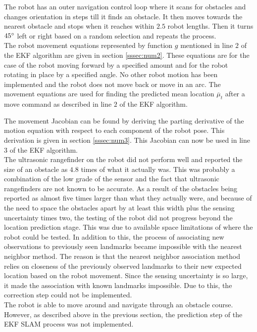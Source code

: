 \documentclass[conference]{IEEEtran}
\begin{document}
The robot has an outer navigation control loop where it scans for obstacles and changes orientation in steps till it finds an obstacle. It then moves towards the nearest obstacle and stops when it reaches within $2.5$ robot lengths. Then it turns $45\degree$ left or right based on a random selection and repeats the process.\\

The robot movement equations represented by function $g$ mentioned in line $2$ of the EKF algorithm are given in section \ref{sssec:num2}. These equations are for the case of the robot moving forward by a specified amount and for the robot rotating in place by a specified angle. No other robot motion has been implemented and the robot does not move back or move in an arc. The movement equations are used for finding the predicted mean location $\overline \mu_t$ after a move command as described in line $2$ of the EKF algorithm.

The movement Jacobian can be found by deriving the parting derivative of the motion equation with respect to each component of the robot pose. This derivation is given in section \ref{sssec:num3}. This Jacobian can now be used in line $3$ of the EKF algorithm.\\

The ultrasonic rangefinder on the robot did not perform well and reported the size of an obstacle as $4.8$ times of what it actually was. This was probably a combination of the low grade of the sensor and the fact that ultrasonic rangefinders are not known to be accurate. As a result of the obstacles being reported as almost five times larger than what they actually were, and because of the need to space the obstacles apart by at least this width plus the sensing uncertainty times two, the testing of the robot did not progress beyond the location prediction stage. This was due to available space limitations of where the robot could be tested. In addition to this, the process of associating new observations to previously seen landmarks became impossible with the nearest neighbor method. The reason is that the nearest neighbor association method relies on closeness of the previously observed landmarks to their new expected location based on the robot movement. Since the sensing uncertainty is so large, it made the association with known landmarks impossible. Due to this, the correction step could not be implemented.\\

The robot is able to move around and navigate through an obstacle course. However, as described above in the previous section, the prediction step of the EKF SLAM process was not implemented.\\
\end{document}
